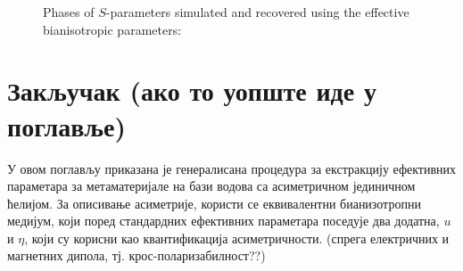 \begin{figure}[!t]
\centering
{}
\caption{Phases of $S$-parameters simulated and recovered using the effective bianisotropic parameters: }
\label{ph:fig9}
\end{figure} 

\section{Закључак (ако то уопште иде у поглавље)}

У овом поглављу приказана је генералисана процедура за екстракцију ефективних параметара за метаматеријале на бази водова са асиметричном јединичном ћелијом. За описивање асиметрије, користи се еквивалентни бианизотропни медијум, који поред стандардних ефективних параметара поседује два додатна, $u$ и $\eta$, који су корисни као квантификација асиметричности. (спрега електричних и магнетних дипола, тј. крос-поларизабилност??)

